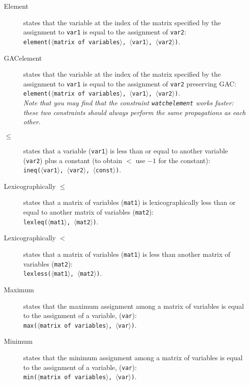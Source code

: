 \documentclass{article}
\begin{document}
\begin{small}
\begin{description}
\item[Element] states that the variable at the index of the matrix
specified by the assignment to \texttt{var1} is equal to the
assignment of \texttt{var2}:\\ \texttt{element($\langle$matrix of
variables$\rangle$, $\langle$var1$\rangle$, $\langle$var2$\rangle$)}.

\item[GACelement] states that the variable at the index of the matrix
specified by the assignment to \texttt{var1} is equal to the
assignment of \texttt{var2} preserving GAC:\\ \texttt{element($\langle$matrix of
variables$\rangle$, $\langle$var1$\rangle$, $\langle$var2$\rangle$)}.\\
\emph{Note that you may find that the constraint \texttt{watchelement} works faster: these two constraints should always perform the same propagations as each other.}
 

\item[$\mathbf{\leq}$] states that a variable (\texttt{var1}) is less
than or equal to another variable (\texttt{var2}) plus a constant (to
obtain $<$ use $-1$ for the constant):\\
\texttt{ineq($\langle$var1$\rangle$, $\langle$var2$\rangle$,
$\langle$const$\rangle$)}.

\item[Lexicographically $\mathbf{\leq}$] states that a matrix of
variables (\texttt{mat1}) is lexicographically less than or equal to
another matrix of variables (\texttt{mat2}):\\
\texttt{lexleq($\langle$mat1$\rangle$, $\langle$mat2$\rangle$)}.

\item[Lexicographically $\mathbf{<}$] states that a matrix of
variables (\texttt{mat1}) is less than another matrix of variables
(\texttt{mat2}):\\
\texttt{lexless($\langle$mat1$\rangle$, $\langle$mat2$\rangle$)}.

\item[Maximum] states that the maximum assignment among a matrix of
variables is equal to the assignment of a variable, (\texttt{var}):\\
\texttt{max($\langle$matrix of variables$\rangle$,
$\langle$var$\rangle$)}.

\item[Minimum] states that the minimum assignment among a matrix of
variables is equal to the assignment of a variable, (\texttt{var}):\\
\texttt{min($\langle$matrix of variables$\rangle$,
$\langle$var$\rangle$)}.


\end{description}
\end{small}
\end{document}
